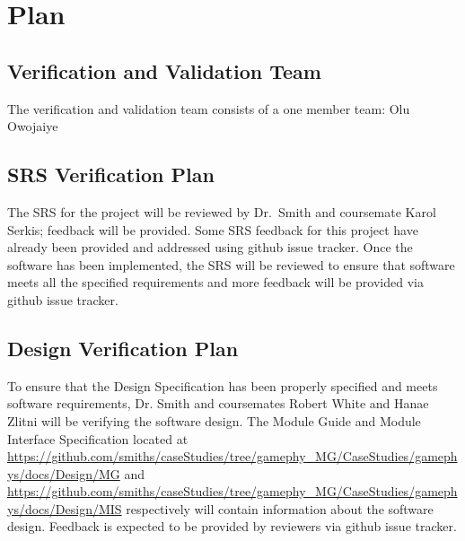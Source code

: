 \documentclass[12pt, titlepage]{article}
\begin{document}

\section{Plan}
	
\subsection{Verification and Validation Team}
The verification and validation team consists of a one member team: Olu Owojaiye

\subsection{SRS Verification Plan}
The SRS for the project will be reviewed by Dr.\ Smith  and coursemate Karol Serkis;
feedback will be provided. Some SRS feedback for this project have already been provided and addressed using github issue tracker. Once the software has been implemented, the SRS will be reviewed to ensure that software meets all the specified requirements and more feedback will be provided via github issue tracker.



\subsection{Design Verification Plan}
To ensure that the Design Specification has been properly specified and meets
software requirements, Dr. Smith and coursemates Robert White and Hanae Zlitni will be verifying the software design. The Module Guide and Module Interface Specification located at \url{https://github.com/smiths/caseStudies/tree/gamephy_MG/CaseStudies/gamephys/docs/Design/MG} and \url{https://github.com/smiths/caseStudies/tree/gamephy_MG/CaseStudies/gamephys/docs/Design/MIS} respectively will
contain information about the software design. Feedback is expected to be
provided by reviewers via github issue tracker.  
\end{document}
